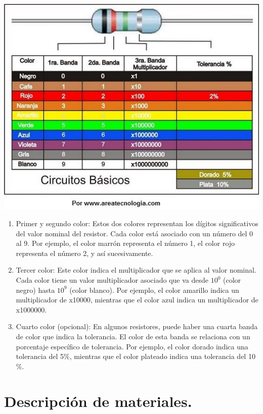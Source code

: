 \documentclass[10pt]{article}
\begin{document}
\begin{multicols}{2}
\begin{center}
	\includegraphics[scale = 0.4]{Imagenes/Fotos/codigo-colores-resistencias.jpg}
\end{center}

\begin{enumerate}
	\item Primer y segundo color: Estos dos colores representan los dígitos significativos del valor nominal del resistor. Cada color está asociado con un número del 0 al 9. Por ejemplo, el color marrón representa el número 1, el color rojo representa el número 2, y así sucesivamente.
	\item Tercer color: Este color indica el multiplicador que se aplica al valor nominal. Cada color tiene un valor multiplicador asociado que va desde $10^0$ (color negro) hasta $10^{9}$ (color blanco). Por ejemplo, el color amarillo indica un multiplicador de x10000, mientras que el color azul indica un multiplicador de x1000000.
	\item Cuarto color (opcional): En algunos resistores, puede haber una cuarta banda de color que indica la tolerancia. El color de esta banda se relaciona con un porcentaje específico de tolerancia. Por ejemplo, el color dorado indica una tolerancia del 5$\%$, mientras que el color plateado indica una tolerancia del 10$\%$.
\end{enumerate}
\section{Descripción de materiales.}


\end{multicols}
\end{document}
